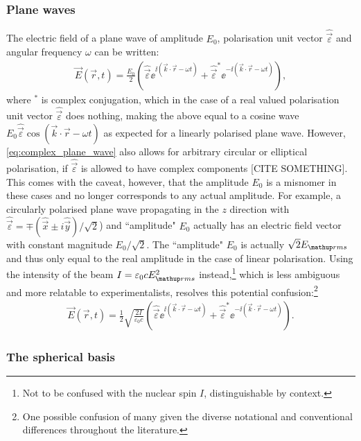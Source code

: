 \subsubsection{Plane waves}

The electric field of a plane wave of amplitude $E_0$, polarisation unit vector $\hat{\vec\varepsilon}$ and angular frequency $\omega$ can be written:
\begin{align}\label{eq:complex_plane_wave}
\vec E(\vec r, t) = \frac{E_0}2
\left(\hat{\vec\varepsilon} \ee^{\ii(\vec k \cdot \vec r - \omega t)}
+ \hat{\vec\varepsilon}^* \ee^{-\ii(\vec k \cdot \vec r - \omega t)} \right),
\end{align}
where $^*$ is complex conjugation, which in the case of a real valued polarisation unit vector $\hat{\vec\varepsilon}$ does nothing, making the above equal to a cosine wave $E_0\hat{\vec\varepsilon}\cos(\vec k \cdot \vec r - \omega t)$ as expected for a linearly polarised plane wave. However, \eqref{eq:complex_plane_wave} also allows for arbitrary circular or elliptical polarisation, if $\hat{\vec\varepsilon}$ is allowed to have complex components [CITE SOMETHING]. This comes with the caveat, however, that the amplitude $E_0$ is a misnomer in these cases and no longer corresponds to any actual amplitude. For example, a circularly polarised plane wave propagating in the $z$ direction with $\hat{\vec\varepsilon}=\mp(\hat{\vec{x}} \pm i \hat{\vec y})/\sqrt{2}$) and ``amplitude" $E_0$ actually has an electric field vector with constant magnitude $E_0/\sqrt{2}$. The ``amplitude" $E_0$ is actually $\sqrt{2}E_\up{rms}$ and thus only equal to the real amplitude in the case of linear polarisation. Using the intensity of the beam $I=\varepsilon_0 c E_\up{rms}^2$ instead,\footnote{Not to be confused with the nuclear spin $I$, distinguishable by context.} which is less ambiguous and more relatable to experimentalists, resolves this potential confusion:\footnote{One possible confusion of many given the diverse notational and conventional differences throughout the literature.}
\begin{align}\label{eq:complex_plane_wave_intensity}
\vec E(\vec r, t) = \frac12\sqrt{\frac{2I}{\varepsilon_0 c}}
\left(\hat{\vec\varepsilon} \ee^{\ii(\vec k \cdot \vec r - \omega t)}
+ \hat{\vec\varepsilon}^* \ee^{-\ii(\vec k \cdot \vec r - \omega t)} \right).
\end{align}

\subsubsection{The spherical basis}

